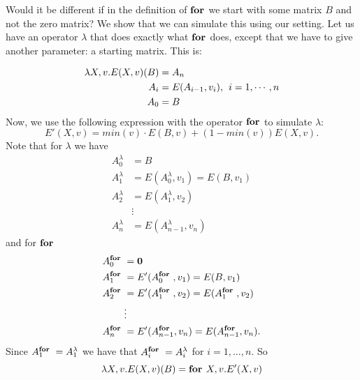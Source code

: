 Would it be different if in the definition of $\textbf{for }$we start with some matrix $B$ and not the zero matrix? We show that we can simulate this using our setting. Let us have an operator $\lambda$ that does exactly what $\textbf{for }$does, except that we have to give another parameter: a starting matrix. This is:

\begin{align*}
\lambda X, v.E(X,v)(B)&=A_n \\
A_i&=E(A_{i-1}, v_{i}),\hspace{1ex}i=1,\cdots, n \\
A_0&=B
\end{align*}
Now, we use the following expression with the operator $\textbf{for }$to simulate $\lambda$: $$E'(X,v)=min(v)\cdot E(B,v)+(1-min(v))E(X,v).$$
Note that for $\lambda$ we have 
\begin{align*}
	A^{\lambda}_0&=B \\
	A^{\lambda}_1&=E(A^{\lambda}_0,v_1)=E(B,v_1) \\
	A^{\lambda}_2&=E(A^{\lambda}_1,v_2) \\
	&\vdots \\
	A^{\lambda}_n&=E(A^{\lambda}_{n-1}, v_n)
\end{align*}
and for $\textbf{for }$
\begin{align*}
	A^{\textbf{for }}_0&=\mathbf{0} \\
	A^{\textbf{for }}_1&=E'(A^{\textbf{for }}_0,v_1)=E(B,v_1) \\
	A^{\textbf{for }}_2&=E'(A^{\textbf{for }}_1,v_2)=E(A^{\textbf{for }}_1,v_2) \\
	&\vdots \\
	A^{\textbf{for }}_n&=E'(A^{\textbf{for }}_{n-1}, v_n)=E(A^{\textbf{for }}_{n-1}, v_n).
\end{align*}
Since $A^{\textbf{for }}_1=A^{\lambda}_1$ we have that $A^{\textbf{for }}_i=A^{\lambda}_i$ for $i=1,\ldots,n$. So $$\lambda X, v.E(X,v)(B)=\textbf{for } X, v.E'(X,v)$$